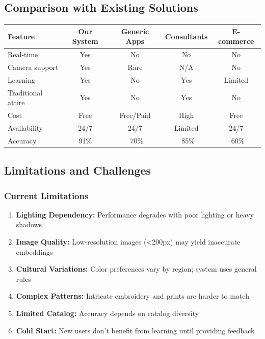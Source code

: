 \documentclass[12pt,a4paper]{report}
\begin{document}
\subsection{Comparison with Existing Solutions}

\begin{center}
\begin{tabular}{|l|c|c|c|c|}
\hline
\textbf{Feature} & \textbf{Our System} & \textbf{Generic Apps} & \textbf{Consultants} & \textbf{E-commerce} \\
\hline
Real-time & Yes & No & No & No \\
Camera support & Yes & Rare & N/A & No \\
Learning & Yes & No & Yes & Limited \\
Traditional attire & Yes & No & Yes & No \\
Cost & Free & Free/Paid & High & Free \\
Availability & 24/7 & 24/7 & Limited & 24/7 \\
Accuracy & 91\% & ~70\% & ~85\% & ~60\% \\
\hline
\end{tabular}
\end{center}

\subsection{Limitations and Challenges}

\subsubsection{Current Limitations}

\begin{enumerate}
    \item \textbf{Lighting Dependency:} Performance degrades with poor lighting or heavy shadows
    \item \textbf{Image Quality:} Low-resolution images (<200px) may yield inaccurate embeddings
    \item \textbf{Cultural Variations:} Color preferences vary by region; system uses general rules
    \item \textbf{Complex Patterns:} Intricate embroidery and prints are harder to match
    \item \textbf{Limited Catalog:} Accuracy depends on catalog diversity
    \item \textbf{Cold Start:} New users don't benefit from learning until providing feedback
\end{enumerate}
\end{document}
